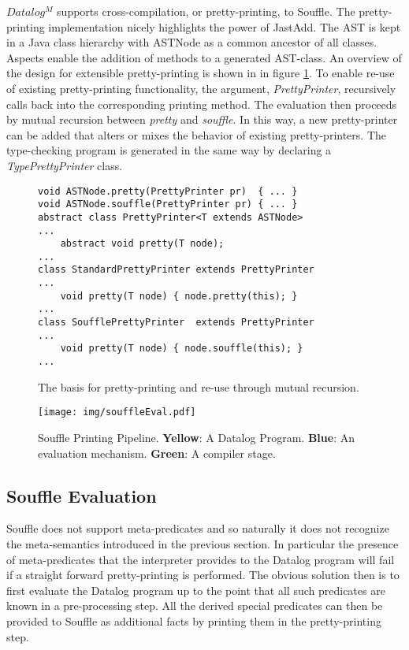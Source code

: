  $Datalog^M$ supports cross-compilation, or pretty-printing, to Souffle. The pretty-printing implementation nicely highlights the power of JastAdd. The AST is kept in a Java class hierarchy with ASTNode as a common ancestor of all classes.
Aspects enable the addition of methods to a generated AST-class. An overview of the design for extensible pretty-printing is shown in in figure \ref{figure:pretty}. To enable re-use of existing pretty-printing functionality, the argument, \textit{PrettyPrinter}, recursively calls back into the corresponding printing method. The evaluation then proceeds by mutual recursion between \textit{pretty} and \textit{souffle}. In this way, a new pretty-printer can be added that alters or mixes the behavior of existing pretty-printers. The type-checking program is generated in the same way by declaring a \textit{TypePrettyPrinter} class.


\begin{figure}[!ht]
\begin{verbatim}
void ASTNode.pretty(PrettyPrinter pr)  { ... }
void ASTNode.souffle(PrettyPrinter pr) { ... }
abstract class PrettyPrinter<T extends ASTNode> 
...
    abstract void pretty(T node);
...
class StandardPrettyPrinter extends PrettyPrinter 
...
    void pretty(T node) { node.pretty(this); }
...
class SoufflePrettyPrinter  extends PrettyPrinter 
... 
    void pretty(T node) { node.souffle(this); }
...
\end{verbatim}
\caption{The basis for pretty-printing and re-use through mutual recursion.}
\label{figure:pretty}
\end{figure}

\begin{figure*}[!ht]
	\texttt{[image: img/souffleEval.pdf]}
	\caption{Souffle Printing Pipeline. \textbf{Yellow}: A Datalog Program. \textbf{Blue}: An evaluation mechanism. \textbf{Green}: A compiler stage. }
	\label{figure:soufflePipeline}
\end{figure*}
\noindent
\subsection{Souffle Evaluation}
Souffle does not support meta-predicates and so naturally it does not recognize the meta-semantics introduced in the previous section. In particular the presence of meta-predicates that the interpreter provides to the Datalog program will fail if a straight forward pretty-printing is performed. The obvious solution then is to first evaluate the Datalog program up to the point that all such predicates are known in a pre-processing step. All the derived special predicates can then be provided to Souffle as additional facts by printing them in the pretty-printing step.